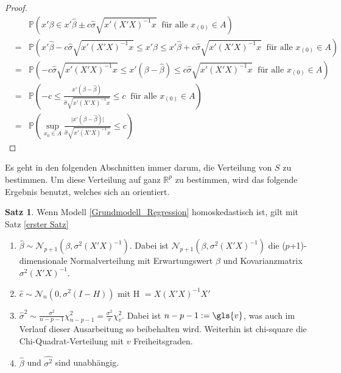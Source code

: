 \documentclass[12pt,a4paper]{article}
\theoremstyle{definition}
\theoremstyle{definition}
\newtheorem{Satz}[Definition]{Satz}
\theoremstyle{definition}
\theoremstyle{definition}
\begin{document}
\begin{proof}
\begin{eqnarray*}
&& \mathbb{P} \left( x'\beta \in x' \hat{\beta} \pm c \hat{\sigma} \sqrt{x' (X'X)^{-1}x} ~ \text{ für alle } x_{(0)} \in A \right) \\
&=& \mathbb{P} \left( x' \hat{\beta} - c \hat{\sigma} \sqrt{x' (X'X)^{-1}x} \leq x'\beta \leq x' \hat{\beta} + c \hat{\sigma} \sqrt{x' (X'X)^{-1}x} ~ \text{ für alle } x_{(0)} \in A \right) \\
&=& \mathbb{P} \left( - c \hat{\sigma} \sqrt{x' (X'X)^{-1}x} \leq x' (\beta - \hat{\beta}) \leq  c \hat{\sigma} \sqrt{x' (X'X)^{-1}x} ~ \text{ für alle } x_{(0)} \in A \right) \\
&=& \mathbb{P} \left( - c  \leq \frac{x' (\beta - \hat{\beta})}{\hat{\sigma} \sqrt{x' (X'X)^{-1}x}}  \leq  c ~ \text{ für alle } x_{(0)} \in A \right) \\
&=& \mathbb{P} \left( \sup_{x_{0} \in A}  \frac{\vert x'(\beta - \hat{\beta}) \vert}{\hat{\sigma} \sqrt{x'(X'X)^{-1}x}}  \leq c \right)
\end{eqnarray*}
\end{proof}

Es geht in den folgenden Abschnitten immer darum, die Verteilung von $S$ zu bestimmen. Um diese Verteilung auf ganz $\mathbb{R}^p$ zu bestimmen, wird das folgende Ergebnis benutzt, welches sich an \cite[6]{Liu64} orientiert. 

\begin{Satz} \label{Basiseigenschaften}
Wenn Modell \eqref{Grundmodell_Regression} homoskedastisch ist, gilt mit Satz \ref{erster Satz} 

\begin{enumerate}
\item $\hat{\beta} \sim \mathscr{N}_{p+1}(\beta,\sigma^2(X'X)^{-1})$. Dabei ist $\mathscr{N}_{p+1}(\beta,\sigma^2(X'X)^{-1})$ die ($p$+1)-dimensionale Normalverteilung mit Erwartungswert $\beta$ und Kovarianzmatrix $\sigma^2 (X'X)^{-1}$.
\item $\hat{e} \sim \mathscr{N}_{n}(0,\sigma^2(I-H)) $ mit  \gls{H} $=X(X'X)^{-1}X' $
\item $\hat{\sigma}^2 \sim \frac{\sigma^2}{n-p-1}\chi_{n-p-1}^2 = \frac{\sigma^2}{v}\chi^2_{v}$. Dabei ist $n-p-1 := \gls{v}$, was auch im Verlauf dieser Ausarbeitung so beibehalten wird. Weiterhin ist \gls{chi-square} die Chi-Quadrat-Verteilung mit $v$ Freiheitsgraden.
\item $\hat{\beta}$ und $\widehat{\sigma^2}$ sind unabhängig.
\end{enumerate}
\end{Satz}
\end{document}
